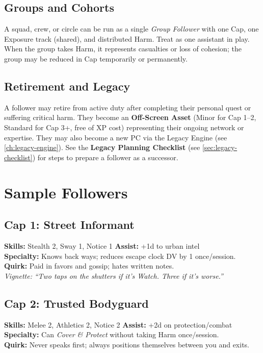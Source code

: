 \subsection*{Groups and Cohorts}
A squad, crew, or circle can be run as a single \emph{Group Follower} with one Cap, one Exposure track (shared), and distributed Harm. Treat as one assistant in play. When the group takes Harm, it represents casualties or loss of cohesion; the group may be reduced in Cap temporarily or permanently.

\subsection*{Retirement and Legacy}
A follower may retire from active duty after completing their personal quest or suffering critical harm. They become an \textbf{Off-Screen Asset} (Minor for Cap 1--2, Standard for Cap 3+, free of XP cost) representing their ongoing network or expertise. They may also become a new PC via the Legacy Engine (see \ref{ch:legacy-engine}). See the \textbf{Legacy Planning Checklist} (see \ref{sec:legacy-checklist}) for steps to prepare a follower as a successor.

\section{Sample Followers}

\subsection*{Cap 1: Street Informant}
\textbf{Skills:} Stealth 2, Sway 1, Notice 1 \quad
\textbf{Assist:} +1d to urban intel \\
\textbf{Specialty:} Knows back ways; reduces escape clock DV by 1 once/session. \\
\textbf{Quirk:} Paid in favors and gossip; hates written notes. \\
\emph{Vignette:} \textit{``Two taps on the shutters if it's Watch. Three if it's worse.''}

\subsection*{Cap 2: Trusted Bodyguard}
\textbf{Skills:} Melee 2, Athletics 2, Notice 2 \quad
\textbf{Assist:} +2d on protection/combat \\
\textbf{Specialty:} Can \emph{Cover \& Protect} without taking Harm once/session. \\
\textbf{Quirk:} Never speaks first; always positions themselves between you and exits.

